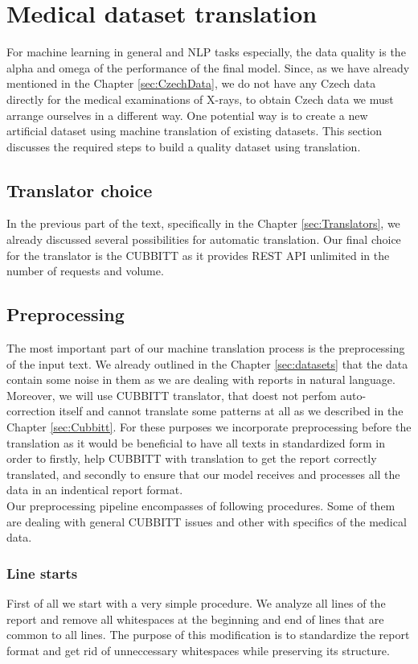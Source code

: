 \section{Medical dataset translation}
\label{sec:medDataTranslation}
For machine learning in general and NLP tasks especially, the data quality is the alpha and omega of the performance of the final model. Since, as we have already mentioned in the Chapter \ref{sec:CzechData}, we do not have any Czech data directly for the medical examinations of X-rays, to obtain Czech data we must arrange ourselves in a different way. One potential way is to create a new artificial dataset using machine translation of existing datasets. This section discusses the required steps to build a quality dataset using translation.

\subsection{Translator choice}
In the previous part of the text, specifically in the Chapter \ref{sec:Translators}, we already discussed several possibilities for automatic translation. Our final choice for the translator is the CUBBITT as it provides REST API unlimited in the number of requests and volume.

\subsection{Preprocessing}
\label{sec:DataPreprocessing}
The most important part of our machine translation process is the preprocessing of the input text. We already outlined in the Chapter \ref{sec:datasets} that the data contain some noise in them as we are dealing with reports in natural language. Moreover, we will use CUBBITT translator, that doest not perfom auto-correction itself and cannot translate some patterns at all as we described in the Chapter \ref{sec:Cubbitt}. For these purposes we incorporate preprocessing before the translation as it would be beneficial to have all texts in standardized form in order to firstly, help CUBBITT with translation to get the report correctly translated, and secondly to ensure that our model receives and processes all the data in an indentical report format.\\

Our preprocessing pipeline encompasses of following procedures. Some of them are dealing with general CUBBITT issues and other with specifics of the medical data.

\subsubsection*{Line starts}
First of all we start with a very simple procedure. We analyze all lines of the report and remove all whitespaces at the beginning and end of lines that are common to all lines. The purpose of this modification is to standardize the report format and get rid of unneccessary whitespaces while preserving its structure.

